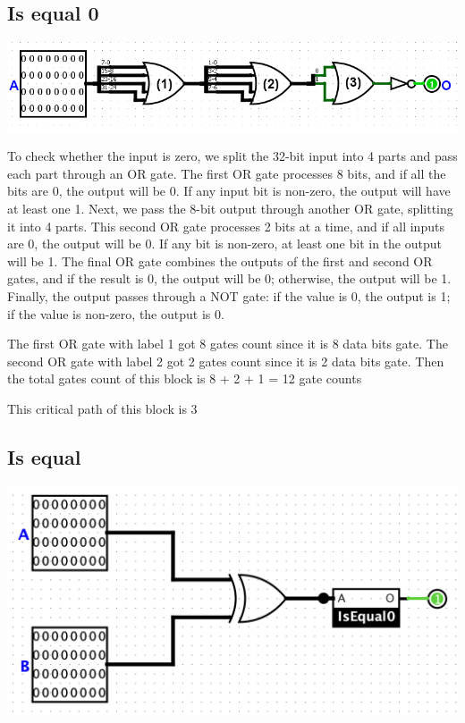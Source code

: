 \documentclass{article}
\begin{document}
\subsection{Is equal 0}
\begin{center}
    \includegraphics[width=1\textwidth]{images/IsEqual0.png}
\end{center}

\hspace{2em}To check whether the input is zero, we split the 32-bit input into 4 parts and pass each part through an OR gate. The first OR gate processes 8 bits, and if all the bits are 0, the output will be 0. If any input bit is non-zero, the output will have at least one 1. Next, we pass the 8-bit output through another OR gate, splitting it into 4 parts. This second OR gate processes 2 bits at a time, and if all inputs are 0, the output will be 0. If any bit is non-zero, at least one bit in the output will be 1. The final OR gate combines the outputs of the first and second OR gates, and if the result is 0, the output will be 0; otherwise, the output will be 1. Finally, the output passes through a NOT gate: if the value is 0, the output is 1; if the value is non-zero, the output is 0.

\hspace{2em}The first OR gate with label 1 got 8 gates count since it is 8 data bits gate. The second OR gate with label 2 got 2 gates count since it is 2 data bits gate. Then the total gates count of this block is 8 + 2 + 1 = 12 gate counts

\hspace{2em}This critical path of this block is 3
\subsection{Is equal}
\begin{center}
    \includegraphics[width=1\textwidth]{images/IsEqual.png}
\end{center}
\end{document}
